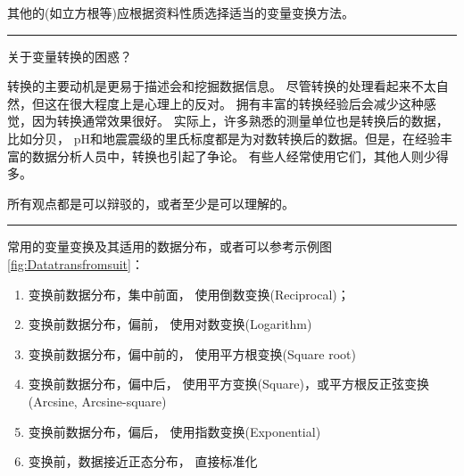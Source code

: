 \documentclass[
]{article}
\providecommand{\tightlist}{%
  \setlength{\itemsep}{0pt}\setlength{\parskip}{0pt}}
\begin{document}
其他的(如立方根等)应根据资料性质选择适当的变量变换方法。

\begin{center}\rule{0.5\linewidth}{0.5pt}\end{center}

关于变量转换的困惑？

转换的主要动机是更易于描述会和挖掘数据信息。 尽管转换的处理看起来不太自然，但这在很大程度上是心理上的反对。
拥有丰富的转换经验后会减少这种感觉，因为转换通常效果很好。 实际上，许多熟悉的测量单位也是转换后的数据，比如分贝，
pH和地震震级的里氏标度都是为对数转换后的数据。但是，在经验丰富的数据分析人员中，转换也引起了争论。
有些人经常使用它们，其他人则少得多。

所有观点都是可以辩驳的，或者至少是可以理解的。

\begin{center}\rule{0.5\linewidth}{0.5pt}\end{center}

常用的变量变换及其适用的数据分布，或者可以参考示例图\ref{fig:Datatransfromsuit}：

\begin{enumerate}
\def\labelenumi{\arabic{enumi}.}
\tightlist
\item
  变换前数据分布，集中前面， 使用倒数变换(Reciprocal)；
\item
  变换前数据分布，偏前， 使用对数变换(Logarithm)
\item
  变换前数据分布，偏中前的， 使用平方根变换(Square root)
\item
  变换前数据分布，偏中后， 使用平方变换(Square)，或平方根反正弦变换(Arcsine, Arcsine-square)
\item
  变换前数据分布，偏后， 使用指数变换(Exponential)
\item
  变换前，数据接近正态分布， 直接标准化
\end{enumerate}
\end{document}
